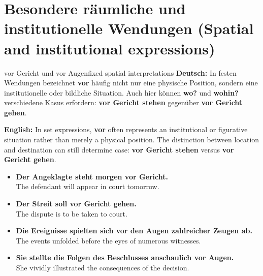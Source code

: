 \documentclass[a4paper,11pt]{article}
\newcommand{\GermanText}[1]{\textbf{Deutsch: }#1\par}
\newcommand{\EnglishText}[1]{{\small\color{SoftGray}\textbf{English: }#1\par}}
\newcommand{\ExampleItem}[2]{\item \textbf{#1}\\{\small\color{SoftGray}#2}}
\begin{document}
    \section{Besondere räumliche und institutionelle Wendungen (Spatial and institutional expressions)}
        \begin{grammarentry}{vor Gericht und vor Augen}{fixed spatial interpretations}
            \GermanText{In festen Wendungen bezeichnet \textbf{vor} häufig nicht nur eine physische Position, sondern eine institutionelle oder bildliche Situation. Auch hier können \textbf{wo?} und \textbf{wohin?} verschiedene Kasus erfordern: \textbf{vor Gericht stehen} gegenüber \textbf{vor Gericht gehen}.}
            \EnglishText{In set expressions, \textbf{vor} often represents an institutional or figurative situation rather than merely a physical position. The distinction between location and destination can still determine case: \textbf{vor Gericht stehen} versus \textbf{vor Gericht gehen}.}
        \end{grammarentry}
        \begin{exbox}
            \begin{itemize}
                \ExampleItem{Der Angeklagte steht morgen vor Gericht.}{The defendant will appear in court tomorrow.}
                \ExampleItem{Der Streit soll vor Gericht gehen.}{The dispute is to be taken to court.}
                \ExampleItem{Die Ereignisse spielten sich vor den Augen zahlreicher Zeugen ab.}{The events unfolded before the eyes of numerous witnesses.}
                \ExampleItem{Sie stellte die Folgen des Beschlusses anschaulich vor Augen.}{She vividly illustrated the consequences of the decision.}
            \end{itemize}
        \end{exbox}
\end{document}
